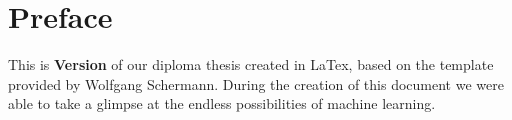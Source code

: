 \chapter{Preface}

%
%
%

This is \textbf{Version \htldiplDate} of our diploma thesis created in LaTex, based on the template provided by Wolfgang Schermann.
During the creation of this document we were able to take a glimpse at the endless possibilities of machine learning.


